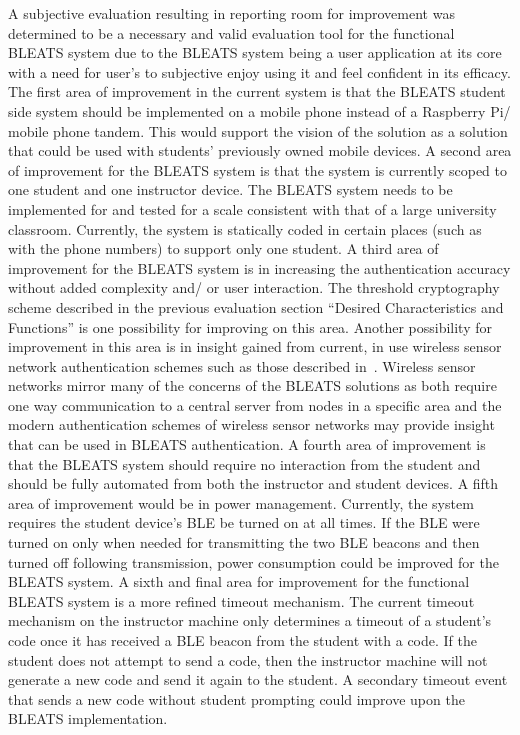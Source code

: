 A subjective evaluation resulting in reporting room for improvement was
determined to be a necessary and valid evaluation tool for the functional
BLEATS system due to the BLEATS system being a user application at its core
with a need for user’s to subjective enjoy using it and feel confident in its
efficacy. The first area of improvement in the current system is that the
BLEATS student side system should be implemented on a mobile phone instead of a
Raspberry Pi/ mobile phone tandem. This would support the vision of the
solution as a solution that could be used with students’ previously owned
mobile devices. A second area of improvement for the BLEATS system is that the
system is currently scoped to one student and one instructor device. The BLEATS
system needs to be implemented for and tested for a scale consistent with that
of a large university classroom. Currently, the system is statically coded in
certain places (such as with the phone numbers) to support only one student. A
third area of improvement for the BLEATS system is in increasing the
authentication accuracy without added complexity and/ or user interaction. The
threshold cryptography scheme described in the previous evaluation section
“Desired Characteristics and Functions” is one possibility for improving on
this area. Another possibility for improvement in this area is in insight
gained from current, in use wireless sensor network authentication schemes such
as those described in~\cite{kumari2014cryptanalysis}. Wireless sensor networks
mirror many of the concerns of the BLEATS solutions as both require one way
communication to a central server from nodes in a specific area and the modern
authentication schemes of wireless sensor networks may provide insight that can
be used in BLEATS authentication. A fourth area of improvement is that the
BLEATS system should require no interaction from the student and should be
fully automated from both the instructor and student devices. A fifth area of
improvement would be in power management. Currently, the system requires the
student device’s BLE be turned on at all times. If the BLE were turned on only
when needed for transmitting the two BLE beacons and then turned off following
transmission, power consumption could be improved for the BLEATS system. A
sixth and final area for improvement for the functional BLEATS system is a more
refined timeout mechanism. The current timeout mechanism on the instructor
machine only determines a timeout of a student’s code once it has received a
BLE beacon from the student with a code. If the student does not attempt to
send a code, then the instructor machine will not generate a new code and send
it again to the student. A secondary timeout event that sends a new code
without student prompting could improve upon the BLEATS implementation.

